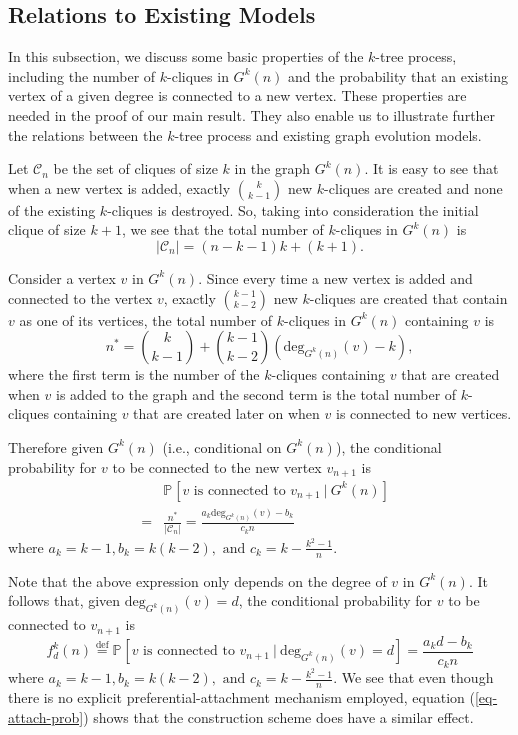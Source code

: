 \documentclass[11pt]{article}
\providecommand{\probab}[2]{\mathbb{P}_{#2}\left[#1\right]}
\providecommand{\binom}[2]{{#1\choose#2}}
\providecommand{\degree}[2]{{\textrm{deg}_{#1}(#2)}}
\providecommand{\vcprob}[3]{f^{#1}_{#2}(#3)}
\providecommand{\rktree}[2]{G^{#1}(#2)}
\begin{document}
\subsection{Relations to Existing Models}
In this subsection, we discuss some basic properties of the $k$-tree process, 
including the number of $k$-cliques in $G^{k}(n)$ and the probability 
that an existing vertex of a given degree is connected to a new vertex. These properties 
are needed in the proof of  our main result. They also enable us to illustrate further the relations between the $k$-tree process and existing graph evolution models.     

Let $\mathcal{C}_{n}$ be the set of cliques of size $k$ in the graph $\rktree{k}{n}$.
It is easy to see that when a new vertex is added, exactly $\binom{k}{k - 1}$ new $k$-cliques are created and none of the existing $k$-cliques is destroyed.
So, taking into consideration the initial clique of size $k + 1$, we see that the total number of $k$-cliques in
$\rktree{k}{n}$ is
$$
|\mathcal{C}_n| = (n - k - 1)k + (k + 1).
$$

Consider a vertex $v$ in $G^{k}(n)$. 
Since every time a new vertex is added and connected to the vertex $v$, 
exactly $\binom{k - 1}{k - 2}$  new $k$-cliques are created
that contain $v$ as one of its vertices, the total number of $k$-cliques in $\rktree{k}{n}$ containing $v$ is
\begin{equation}
 n^{*} = \binom{k}{k - 1} + \binom{k - 1}{k - 2}(\degree{\rktree{k}{n}}{v} - k),
\end{equation}
where the first term is the number of the $k$-cliques containing $v$ that are created when $v$ is added to the graph and the second term is the total number of $k$-cliques 
containing $v$ that are created later on when $v$ is connected to new vertices. 

Therefore given $G^{k}(n)$ (i.e., conditional on $G^{k}(n)$),  the conditional
probability for $v$ to be connected to the new vertex $v_{n + 1}$ is
\begin{eqnarray}
\label{eq:prop}
&&\probab{v \textrm{ is connected to } v_{n + 1}\ |\ \rktree{k}{n}}{} \nonumber \\ 
 &=& \frac{n^{*}}{|\mathcal{C}_n|}
 = \frac{a_k\degree{\rktree{k}{n}}{v} - b_k}{c_k n}
\end{eqnarray}
where $a_k = k - 1, b_k = k(k-2), \textrm{ and } c_k = k - \frac{k^2 - 1}{n}$. 

Note that the above expression only depends on the degree of $v$ in $\rktree{k}{n}$. 
It follows that, given $\degree{\rktree{k}{n}}{v} = d$,
the conditional probability for $v$ to be connected to $v_{n + 1}$ is
\begin{equation}
\label{eq-attach-prob}
\vcprob{k}{d}{n} \stackrel{\text{def}}{=} 
  \probab{v \textrm{ is connected to } v_{n+1} \ |\ \degree{\rktree{k}{n}}{v} = d}  {}
 =  \frac{a_kd - b_k}{c_k n}
\end{equation}
where $a_k = k - 1, b_k = k(k-2), \textrm{ and } c_k = k - \frac{k^2 - 1}{n}$.
We see that even though there is no explicit preferential-attachment mechanism employed, equation (\ref{eq-attach-prob}) shows that the construction scheme does have a similar effect.
\end{document}
